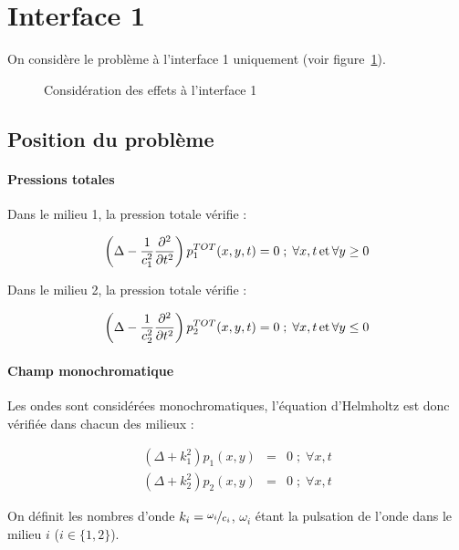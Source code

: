 \section{Interface 1}

On considère le problème à l'interface 1 uniquement (voir figure~\ref{iface1}).

\begin{figure}[!h]
    \centering{}
    \caption{\label{iface1} Considération des effets à l'interface 1}
\end{figure}

\subsection{Position du problème}


\paragraph{Pressions totales} Dans le milieu 1, la pression totale vérifie :

\begin{equation}
    \left(\Delta - \frac{1}{c_1^2}\frac{\partial^2}{\partial t^2}\right)p^{TOT}_1(x,y,t) = 0 \;;\; \forall x,t \,\mathrm{et}\, \forall y \geq 0 \label{i1_prop1}
\end{equation}


Dans le milieu 2, la pression totale vérifie :

\begin{equation}
    \left(\Delta - \frac{1}{c_2^2}\frac{\partial^2}{\partial t^2}\right)p^{TOT}_2(x,y,t) = 0 \;;\; \forall x,t\,\mathrm{et}\,\forall y \leq 0 \label{i1_prop2}
\end{equation}


\paragraph{Champ monochromatique} Les ondes sont considérées monochromatiques, l'équation d'Helmholtz est donc vérifiée
dans chacun des milieux :

\begin{eqnarray}
    (\Delta + k_1^2)p_1(x,y) & = & 0 \;;\; \forall x,t \label{i1_helm1}\\
    (\Delta + k_2^2)p_2(x,y) & = & 0 \;;\; \forall x,t \label{i1_helm2}
\end{eqnarray}

On définit les nombres d'onde $k_i = \nicefrac{\omega_i}{c_i}$, $\omega_i$ étant la pulsation de l'onde dans le milieu
$i$ ($i\in \{1,2\}$).

